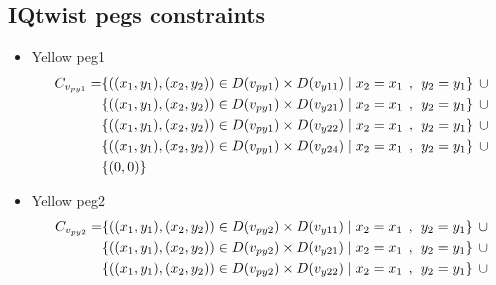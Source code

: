 \begin{appendices}
\section{IQtwist pegs constraints}
\label{appendix:2Dpegs}
\begin{itemize}
  \item Yellow peg1\\
  \begin{align*}  
C_{v_{py1}} = &\{((x_{1},y_{1}),(x_{2},y_{2}))\in D(v_{py1}) \times D(v_{y11})\mid x_{2} = x_{1} \hspace{1ex} , \hspace{1ex}  y_{2} = y_{1}\}\hspace{1ex} \cup  
\\&\{((x_{1},y_{1}),(x_{2},y_{2}))\in D(v_{py1}) \times D(v_{y21})\mid x_{2} = x_{1} \hspace{1ex} , \hspace{1ex}  y_{2} = y_{1}\}\hspace{1ex} \cup 
\\&\{ ((x_{1},y_{1}),(x_{2},y_{2}))\in D(v_{py1}) \times D(v_{y22})\mid x_{2} = x_{1} \hspace{1ex} , \hspace{1ex}  y_{2} = y_{1}\}\hspace{1ex}\cup 
\\& \{((x_{1},y_{1}),(x_{2},y_{2}))\in D(v_{py1}) \times D(v_{y24})\mid x_{2} = x_{1} \hspace{1ex} , \hspace{1ex}  y_{2} = y_{1}\} \hspace{1ex}\cup
\\& \{(0,0)\}
\end{align*}
  \item Yellow peg2\\
  \begin{align*}
\Constraint{py2} = &\{((x_{1},y_{1}),(x_{2},y_{2}))\in \Domain{py2} \times \Domain{y11}\mid x_{2} = x_{1} \hspace{1ex} , \hspace{1ex}  y_{2} = y_{1}\} \hspace{1ex} \cup 
\\& \{((x_{1},y_{1}),(x_{2},y_{2}))\in \Domain{py2} \times \Domain{y21}\mid x_{2} = x_{1} \hspace{1ex} , \hspace{1ex}  y_{2} = y_{1}\} \hspace{1ex} \cup 
\\& \{ ((x_{1},y_{1}),(x_{2},y_{2}))\in \Domain{py2} \times \Domain{y22}\mid x_{2} = x_{1} \hspace{1ex} , \hspace{1ex}  y_{2} = y_{1}\} \hspace{1ex} \cup 

\end{align*}
\end{itemize}
\end{appendices}
